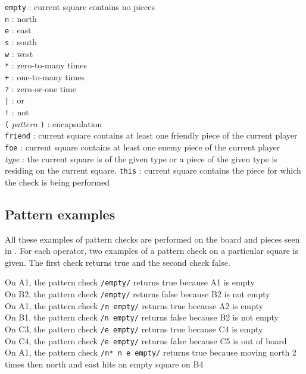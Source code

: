 \texttt{empty} : current square contains no pieces\\
\texttt{n} : north \\
\texttt{e} : east \\
\texttt{s} : south \\
\texttt{w} : west \\
\texttt{*} : zero-to-many times\\
\texttt{+} : one-to-many times\\
\texttt{?} : zero-or-one time\\
\texttt{|} : or\\
\texttt{!} : not\\
\texttt{(} \textit{pattern} \texttt{)} : encapsulation\\
\texttt{friend} :  current square contains at least one friendly piece of the current player\\
\texttt{foe} : current square contains at least one enemy piece of the current player\\
\textit{type} : the current square is of the given type or a piece of the given type is residing on the current square.
\texttt{this} : current square contains the piece for which the check is being performed\\

\subsection{Pattern examples}
\label{sec:patternexamples}
All these examples of pattern checks are performed on the board and pieces seen in . For each operator, two examples of a pattern check on a particular square is given. The first check returns true and the second check false.

On A1, the pattern check \texttt{/empty/} returns true because A1 is empty\\
On B2, the pattern check \texttt{/empty/} returns false because B2 is not empty\\
On A1, the pattern check \texttt{/n empty/} returns true because A2 is empty\\
On B1, the pattern check \texttt{/n empty/} returns false because B2 is not empty\\
On C3, the pattern check \texttt{/e empty/} returns true because C4 is empty\\
On C4, the pattern check \texttt{/e empty/} returns false because C5 is out of board\\
On A1, the pattern check \texttt{/n* n e empty/} returns true because moving north 2 times then north and east hits an empty square on B4\\

